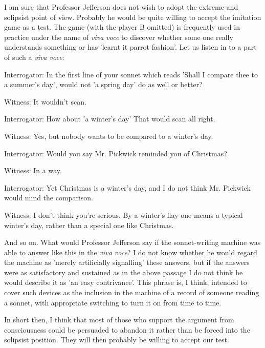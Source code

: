     I am sure that Professor Jefferson does not wish to adopt the extreme and solipsist point of view. Probably he would be quite willing to accept the imitation game as a test. The game (with the player B omitted) is frequently used in practice under the name of \textit{viva voce} to discover whether some one really understands something or has 'learnt it parrot fashion'. Let us listen in to a part of such a \textit{viva voce}:
    \vspace{\baselineskip}

    \begin{hangparas}{3em}{1}
        Interrogator: In the first line of your sonnet which reads 'Shall I compare thee to a summer's day', would not 'a spring day' do as well or better?

        Witness: It wouldn't scan.

        Interrogator: How about 'a winter's day' That would scan all right.

        Witness: Yes, but nobody wants to be compared to a winter's day.

        Interrogator: Would you say Mr. Pickwick reminded you of Christmas?

        Witness: In a way.

        Interrogator: Yet Christmas is a winter's day, and I do not think Mr. Pickwick would mind the comparison.

        Witness: I don't think you're serious. By a winter's flay one means a typical winter's day, rather than a special one like Christmas.
    \end{hangparas}
    \vspace{\baselineskip}

    And so on. What would Professor Jefferson say if the sonnet-writing machine was able to answer like this in the \textit{viva voce}? I do not know whether he would regard the machine as 'merely artificially signalling' these answers, but if the answers were as satisfactory and sustained as in the above passage I do not think he would describe it as 'an easy contrivance'. This phrase is, I think, intended to cover such devices as the inclusion in the machine of a record of someone reading a sonnet, with appropriate switching to turn it on from time to time.

    In short then, I think that most of those who support the argument from consciousness could be persuaded to abandon it rather than be forced into the solipsist position. They will then probably be willing to accept our test.


